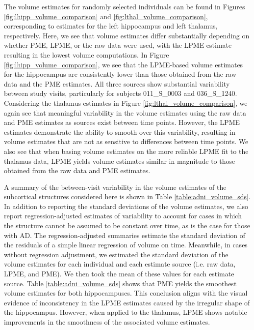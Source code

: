 \documentclass[12pt]{article}
\theoremstyle{definition}
\begin{document}
The volume estimates for randomly selected individuals can be found in Figures \ref{fig:lhipp_volume_comparison} and \ref{fig:lthal_volume_comparison}, corresponding to estimates for the left hippocampus and left thalamus, respectively. Here, we see that volume estimates differ substantially depending on whether PME, LPME, or the raw data were used, with the LPME estimate resulting in the lowest volume computations. In Figure \ref{fig:lhipp_volume_comparison}, we see that the LPME-based volume estimates for the hippocampus are consistently lower than those obtained from the raw data and the PME estimates. All three sources show substantial variability between study visits, particularly for subjects 011\_S\_0003 and 036\_S\_1240. Considering the thalamus estimates in Figure \ref{fig:lthal_volume_comparison}, we again see that meaningful variability in the volume estimates using the raw data and PME estimates as sources exist between time points. However, the LPME estimates demonstrate the ability to smooth over this variability, resulting in volume estimates that are not as sensitive to differences between time points. We also see that when basing volume estimates on the more reliable LPME fit to the thalamus data, LPME yields volume estimates similar in magnitude to those obtained from the raw data and PME estimates.

A summary of the between-visit variability in the volume estimates of the subcortical structures considered here is shown in Table \ref{table:adni_volume_sds}. In addition to reporting the standard deviations of the volume estimates, we also report regression-adjusted estimates of variability to account for cases in which the structure cannot be assumed to be constant over time, as is the case for those with AD. The regression-adjusted summaries estimate the standard deviation of the residuals of a simple linear regression of volume on time. Meanwhile, in cases without regression adjustment, we estimated the standard deviation of the volume estimates for each individual and each estimate source (i.e. raw data, LPME, and PME). We then took the mean of these values for each estimate source. Table \ref{table:adni_volume_sds} shows that PME yields the smoothest volume estimates for both hippocampuses. This conclusion aligns with the visual evidence of inconsistency in the LPME estimates caused by the irregular shape of the hippocampus. However, when applied to the thalamus, LPME shows notable improvements in the smoothness of the associated volume estimates.
\end{document}
